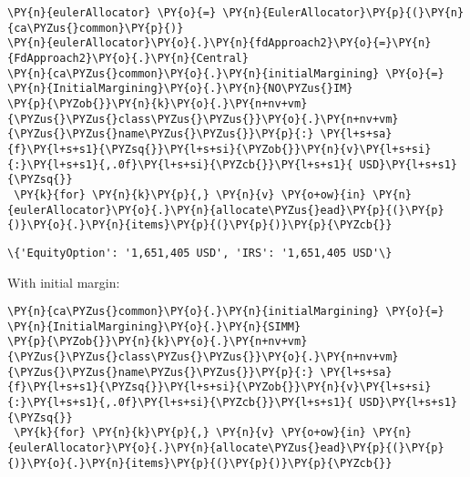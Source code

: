     \begin{tcolorbox}[breakable, size=fbox, boxrule=1pt, pad at break*=1mm,colback=cellbackground, colframe=cellborder]
\begin{Verbatim}[commandchars=\\\{\}]
\PY{n}{eulerAllocator} \PY{o}{=} \PY{n}{EulerAllocator}\PY{p}{(}\PY{n}{ca\PYZus{}common}\PY{p}{)}
\PY{n}{eulerAllocator}\PY{o}{.}\PY{n}{fdApproach2}\PY{o}{=}\PY{n}{FdApproach2}\PY{o}{.}\PY{n}{Central}
\PY{n}{ca\PYZus{}common}\PY{o}{.}\PY{n}{initialMargining} \PY{o}{=} \PY{n}{InitialMargining}\PY{o}{.}\PY{n}{NO\PYZus{}IM}
\PY{p}{\PYZob{}}\PY{n}{k}\PY{o}{.}\PY{n+nv+vm}{\PYZus{}\PYZus{}class\PYZus{}\PYZus{}}\PY{o}{.}\PY{n+nv+vm}{\PYZus{}\PYZus{}name\PYZus{}\PYZus{}}\PY{p}{:} \PY{l+s+sa}{f}\PY{l+s+s1}{\PYZsq{}}\PY{l+s+si}{\PYZob{}}\PY{n}{v}\PY{l+s+si}{:}\PY{l+s+s1}{,.0f}\PY{l+s+si}{\PYZcb{}}\PY{l+s+s1}{ USD}\PY{l+s+s1}{\PYZsq{}}
 \PY{k}{for} \PY{n}{k}\PY{p}{,} \PY{n}{v} \PY{o+ow}{in} \PY{n}{eulerAllocator}\PY{o}{.}\PY{n}{allocate\PYZus{}ead}\PY{p}{(}\PY{p}{)}\PY{o}{.}\PY{n}{items}\PY{p}{(}\PY{p}{)}\PY{p}{\PYZcb{}}
\end{Verbatim}
\end{tcolorbox}

            \begin{tcolorbox}[breakable, size=fbox, boxrule=.5pt, pad at break*=1mm, opacityfill=0]
\begin{Verbatim}[commandchars=\\\{\}]
\{'EquityOption': '1,651,405 USD', 'IRS': '1,651,405 USD'\}
\end{Verbatim}
\end{tcolorbox}
        
    With initial margin:

    \begin{tcolorbox}[breakable, size=fbox, boxrule=1pt, pad at break*=1mm,colback=cellbackground, colframe=cellborder]
\begin{Verbatim}[commandchars=\\\{\}]
\PY{n}{ca\PYZus{}common}\PY{o}{.}\PY{n}{initialMargining} \PY{o}{=} \PY{n}{InitialMargining}\PY{o}{.}\PY{n}{SIMM}
\PY{p}{\PYZob{}}\PY{n}{k}\PY{o}{.}\PY{n+nv+vm}{\PYZus{}\PYZus{}class\PYZus{}\PYZus{}}\PY{o}{.}\PY{n+nv+vm}{\PYZus{}\PYZus{}name\PYZus{}\PYZus{}}\PY{p}{:} \PY{l+s+sa}{f}\PY{l+s+s1}{\PYZsq{}}\PY{l+s+si}{\PYZob{}}\PY{n}{v}\PY{l+s+si}{:}\PY{l+s+s1}{,.0f}\PY{l+s+si}{\PYZcb{}}\PY{l+s+s1}{ USD}\PY{l+s+s1}{\PYZsq{}}
 \PY{k}{for} \PY{n}{k}\PY{p}{,} \PY{n}{v} \PY{o+ow}{in} \PY{n}{eulerAllocator}\PY{o}{.}\PY{n}{allocate\PYZus{}ead}\PY{p}{(}\PY{p}{)}\PY{o}{.}\PY{n}{items}\PY{p}{(}\PY{p}{)}\PY{p}{\PYZcb{}}
\end{Verbatim}
\end{tcolorbox}

